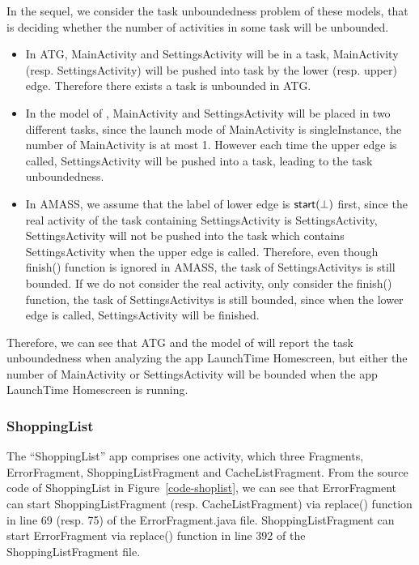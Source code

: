 {In the sequel, we consider the task unboundedness problem of these models, that is deciding whether the number of activities in some task will be unbounded. 
\begin{itemize}
	\item In ATG, MainActivity and SettingsActivity will be in a task, MainActivity (resp. SettingsActivity) will be pushed into task by the lower (resp. upper) edge. Therefore there exists a task is unbounded in ATG.
	\item In the model of \cite{LHR17}, MainActivity and SettingsActivity will be placed in two different tasks, since the launch mode of  MainActivity is singleInstance, the number of MainActivity is at most 1. However each time the upper edge is called, SettingsActivity will be pushed into a task, leading to the task unboundedness.
	\item In AMASS, we assume that the label of lower edge is ${\mathsf{start} }(\bot)$ first, since the real activity of the task containing SettingsActivity is SettingsActivity, SettingsActivity will not be pushed into the task which contains SettingsActivity when the upper edge is called. Therefore, even though finish() function is ignored in AMASS, the task of SettingsActivitys is still bounded. If we do not consider the real activity, only consider the finish() function, the task of SettingsActivitys is still bounded, since when the lower edge is called, SettingsActivity will be finished.
\end{itemize}
Therefore, we can see that ATG and the model of \cite{LHR17} will report the task unboundedness when analyzing the app LaunchTime Homescreen, but either the number of MainActivity or SettingsActivity will be bounded when the app LaunchTime Homescreen is running.
}


%
\subsubsection{ShoppingList}
The ``ShoppingList'' app comprises one activity, which three Fragments, ErrorFragment, ShoppingListFragment and CacheListFragment. From the source code of ShoppingList in Figure~\ref{code-shoplist}, we can see that ErrorFragment can start ShoppingListFragment (resp. CacheListFragment) via replace() function in line 69 (resp. 75) of the ErrorFragment.java file. ShoppingListFragment can start ErrorFragment via replace() function in line 392 of the ShoppingListFragment file. 

